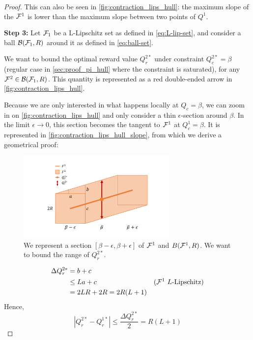 \begin{subappendices}
\begin{proof}
	This can also be seen in \autoref{fig:contraction_lips_hull}: the maximum slope of the $\mathcal{F}^1$ is lower than the maximum slope between two points of $Q^1$.
	
	\textbf{Step 3:} Let $\mathcal{F}_1$ be a L-Lipschitz set as defined in \eqref{eq:L-lip-set}, and consider a ball $\mathcal{B}(\mathcal{F}_1,R)$ around it as defined in \eqref{eq:ball-set}.
	
	We want to bound the optimal reward value $Q_r^{2*}$ under constraint $Q_c^{2*} = \beta$ (regular case in \autoref{sec:proof_pi_hull} where the constraint is saturated), for any $\mathcal{F}^2\in\mathcal{B}(\mathcal{F}_1,R)$. This quantity is represented as a red double-ended arrow in \autoref{fig:contraction_lips_hull}.
	
	Because we are only interested in what happens locally at $Q_c=\beta$, we can zoom in on \autoref{fig:contraction_lips_hull} and only consider a thin $\epsilon$-section around $\beta$. In the limit $\epsilon\rightarrow 0$, this section becomes the tangent to $\mathcal{F}^1$ at $Q_c^1=\beta$. It is represented in \autoref{fig:contraction_lips_hull_slope}, from which we derive a geometrical proof:
	\begin{figure}[ht]
		\centering
		\includegraphics[trim=2cm 1cm 2cm 1cm, clip, width=0.7\textwidth]{img/contraction_lipschitz_slope.pdf}
		\caption{We represent a section $[\beta-\epsilon, \beta+\epsilon]$ of $\mathcal{F}^1$ and $B(\mathcal{F}^1, R)$. We want to bound the range of $Q_r^{2*}.$}
		\label{fig:contraction_lips_hull_slope}
	\end{figure}
	
	\begin{align*}
	\Delta Q_r^{2*} &= b + c &\\
	& \leq La + c & \text{($\mathcal{F}^1$ $L$-Lipschitz)}\\
	&= 2LR+2R = 2R(L+1)
	\end{align*}
	Hence,
	\begin{equation*}
	| Q_r^{2*} - Q_r^{1*}| \leq \frac{\Delta Q_r^{2*}}{2} = R(L+1)
	\end{equation*}
	

\end{proof}
\end{subappendices}
